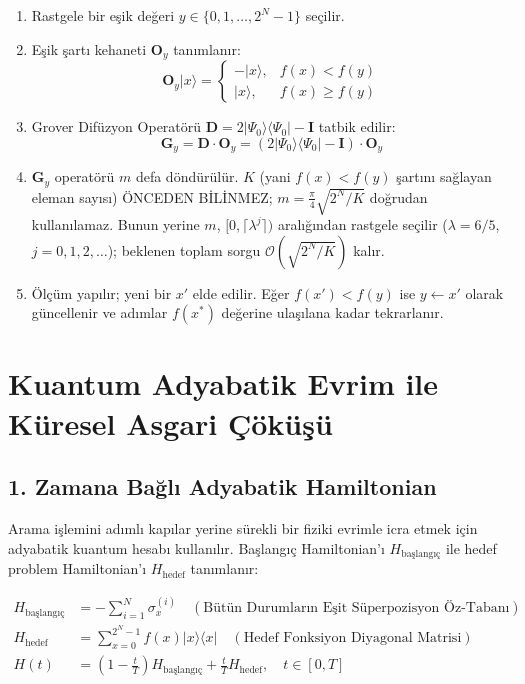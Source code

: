 \documentclass[11pt, a4paper]{article}
\begin{document}
\begin{enumerate}
    \item Rastgele bir eşik değeri $y \in \{0, 1, \dots, 2^N-1\}$ seçilir.
    \item Eşik şartı kehaneti $\mathbf{O}_y$ tanımlanır:
    \begin{equation}
    \mathbf{O}_y |x\rangle = \begin{cases} -|x\rangle, & f(x) < f(y) \\ |x\rangle, & f(x) \ge f(y) \end{cases}
    \end{equation}
    \item Grover Difüzyon Operatörü $\mathbf{D} = 2 |\Psi_0\rangle \langle \Psi_0| - \mathbf{I}$ tatbik edilir:
    \begin{equation}
    \mathbf{G}_y = \mathbf{D} \cdot \mathbf{O}_y = (2 |\Psi_0\rangle \langle \Psi_0| - \mathbf{I}) \cdot \mathbf{O}_y
    \end{equation}
    \item $\mathbf{G}_y$ operatörü $m$ defa döndürülür. $K$ (yani $f(x) < f(y)$ şartını sağlayan eleman sayısı) ÖNCEDEN BİLİNMEZ; $m = \frac{\pi}{4}\sqrt{2^N/K}$ doğrudan kullanılamaz. Bunun yerine $m$, $[0, \lceil \lambda^j \rceil)$ aralığından rastgele seçilir ($\lambda = 6/5$, $j = 0,1,2,\dots$); beklenen toplam sorgu $\mathcal{O}(\sqrt{2^N/K})$ kalır.
    \item Ölçüm yapılır; yeni bir $x'$ elde edilir. Eğer $f(x') < f(y)$ ise $y \leftarrow x'$ olarak güncellenir ve adımlar $f(x^*)$ değerine ulaşılana kadar tekrarlanır.
\end{enumerate}

\section{Kuantum Adyabatik Evrim ile Küresel Asgari Çöküşü}

\subsection{1. Zamana Bağlı Adyabatik Hamiltonian}
Arama işlemini adımlı kapılar yerine sürekli bir fiziki evrimle icra etmek için adyabatik kuantum hesabı kullanılır. Başlangıç Hamiltonian'ı $H_{\text{başlangıç}}$ ile hedef problem Hamiltonian'ı $H_{\text{hedef}}$ tanımlanır:

\begin{align}
H_{\text{başlangıç}} &= -\sum_{i=1}^N \sigma_x^{(i)} \quad (\text{Bütün Durumların Eşit Süperpozisyon Öz-Tabanı}) \\
H_{\text{hedef}} &= \sum_{x=0}^{2^N-1} f(x) |x\rangle \langle x| \quad (\text{Hedef Fonksiyon Diyagonal Matrisi}) \\
H(t) &= \left( 1 - \frac{t}{T} \right) H_{\text{başlangıç}} + \frac{t}{T} H_{\text{hedef}}, \quad t \in [0, T]
\end{align}
\end{document}
